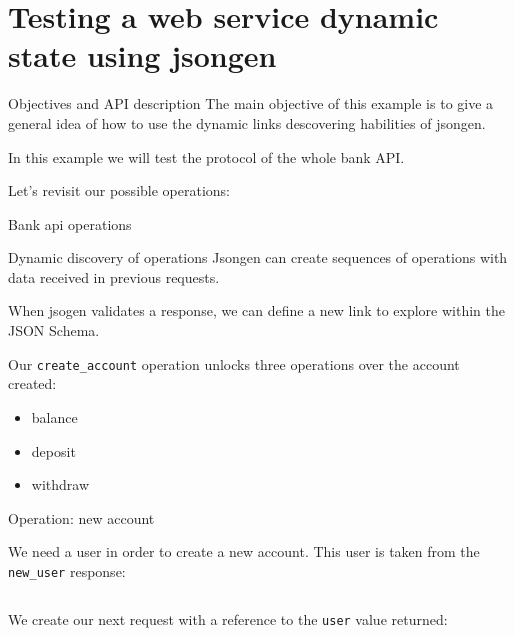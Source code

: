 \section{Testing a web service dynamic state using jsongen}

\begin{frame}{Objectives and API description}%
  The main objective of this example is to give a general idea of how
  to use the dynamic links descovering habilities of jsongen.

  In this example we will test the protocol of the whole bank API.%

  Let's revisit our possible operations:%
\end{frame}

\begin{frame}{Bank api operations}
  \begin{figure}
    \centering
  \end{figure}
\end{frame}

\begin{frame}{Dynamic discovery of operations}%
  Jsongen can create sequences of operations with data received in
  previous requests.

  When jsogen validates a response, we can define a new link to
  explore within the JSON Schema.

  Our \texttt{create\_account} operation unlocks three operations over
  the account created:%
  \begin{itemize}
  \item balance
  \item deposit
  \item withdraw
  \end{itemize}
\end{frame}

\begin{frame}{Operation: new account}

  We need a user in order to create a new account. This user is taken
  from the \texttt{new\_user} response:

  \centering
  \inputminted{js}{./code/example2_user_response-gen.jsch}

  \pause

  We create our next request with a reference to the \texttt{user}
  value returned:

  \centering
  \inputminted{js}{./code/example2_new_account.jsch}
\end{frame}

